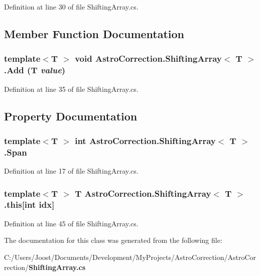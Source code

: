Definition at line 30 of file ShiftingArray.cs.

\subsection{Member Function Documentation}
\subsubsection[{Add}]{\setlength{\rightskip}{0pt plus 5cm}template$<$T $>$ void AstroCorrection.ShiftingArray$<$ T $>$.Add (T {\em value})}\label{class_astro_correction_1_1_shifting_array_3_01_t_01_4_a763fae5c8ea4db5576294ed297242c86}


Definition at line 35 of file ShiftingArray.cs.

\subsection{Property Documentation}
\subsubsection[{Span}]{\setlength{\rightskip}{0pt plus 5cm}template$<$T $>$ int AstroCorrection.ShiftingArray$<$ T $>$.Span\hspace{0.3cm}{\ttfamily  [get]}}\label{class_astro_correction_1_1_shifting_array_3_01_t_01_4_a00a685bef0dbaa2437419119a0ffed09}


Definition at line 17 of file ShiftingArray.cs.
\subsubsection[{this}]{\setlength{\rightskip}{0pt plus 5cm}template$<$T $>$ T AstroCorrection.ShiftingArray$<$ T $>$.this[int idx]\hspace{0.3cm}{\ttfamily  [get]}}\label{class_astro_correction_1_1_shifting_array_3_01_t_01_4_a8cbba66e93d0b6255413ac109682dc73}


Definition at line 45 of file ShiftingArray.cs.

The documentation for this class was generated from the following file:\begin{DoxyCompactItemize}
\item 
C:/Users/Joost/Documents/Development/MyProjects/AstroCorrection/AstroCorrection/{\bf ShiftingArray.cs}\end{DoxyCompactItemize}
